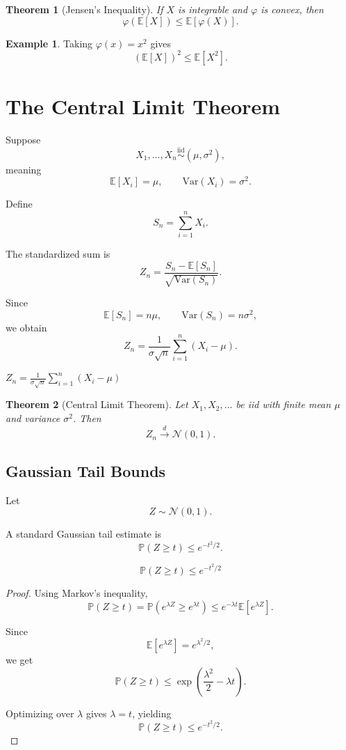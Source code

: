\documentclass[12pt,oneside]{book}
\numberwithin{equation}{section}
\theoremstyle{definition}
\newtheorem{example}{Example}[section]
\theoremstyle{plain}
\newtheorem{theorem}{Theorem}[section]
\theoremstyle{remark}
\newcommand{\E}{\mathbb{E}}
\newcommand{\Var}{\mathrm{Var}}
\newcommand{\Prob}{\mathbb{P}}
\newcommand{\iid}{\overset{\text{iid}}{\sim}}
\newcommand{\convd}{\overset{d}{\to}}
\newcommand{\Normal}{\mathcal{N}}
\begin{document}
\begin{theorem}[Jensen's Inequality]
If $X$ is integrable and $\varphi$ is convex, then
\[
\varphi(\E[X])
\leq
\E[\varphi(X)].
\]
\end{theorem}

\begin{example}
Taking $\varphi(x)=x^2$ gives
\[
(\E[X])^2 \leq \E[X^2].
\]
\end{example}

\section{The Central Limit Theorem}

Suppose
\[
X_1,\dots,X_n
\iid
(\mu,\sigma^2),
\]
meaning
\[
\E[X_i]=\mu,
\qquad
\Var(X_i)=\sigma^2.
\]

Define
\[
S_n=\sum_{i=1}^n X_i.
\]

The standardized sum is
\[
Z_n
=
\frac{S_n-\E[S_n]}
{\sqrt{\Var(S_n)}}.
\]

Since
\[
\E[S_n]=n\mu,
\qquad
\Var(S_n)=n\sigma^2,
\]
we obtain
\[
Z_n
=
\frac{1}{\sigma\sqrt{n}}
\sum_{i=1}^n (X_i-\mu).
\]

$Z_n=\frac{1}{\sigma\sqrt{n}}\sum_{i=1}^n (X_i-\mu)$

\begin{theorem}[Central Limit Theorem]
Let $X_1,X_2,\dots$ be iid with finite mean $\mu$ and variance $\sigma^2$. Then
\[
Z_n
\convd
\Normal(0,1).
\]
\end{theorem}

\subsection{Gaussian Tail Bounds}

Let
\[
Z\sim \Normal(0,1).
\]

A standard Gaussian tail estimate is
\[
\Prob(Z\geq t)
\leq
e^{-t^2/2}.
\]

\[
\mathbb{P}(Z\ge t)\le e^{-t^2/2}
\]

\begin{proof}
Using Markov's inequality,
\[
\Prob(Z\geq t)
=
\Prob(e^{\lambda Z}\geq e^{\lambda t})
\leq
e^{-\lambda t}\E[e^{\lambda Z}].
\]

Since
\[
\E[e^{\lambda Z}]
=
e^{\lambda^2/2},
\]
we get
\[
\Prob(Z\geq t)
\leq
\exp\left(
\frac{\lambda^2}{2}-\lambda t
\right).
\]

Optimizing over $\lambda$ gives $\lambda=t$, yielding
\[
\Prob(Z\geq t)
\leq
e^{-t^2/2}.
\]
\end{proof}
\end{document}
